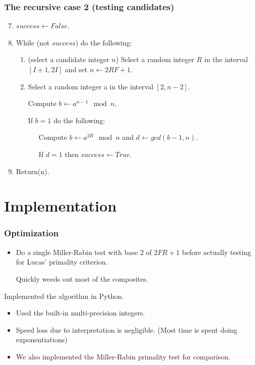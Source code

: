 \documentclass{beamer}
\begin{document}
\begin{frame}
\frametitle{The recursive case 2 (testing candidates)}
\begin{enumerate}
  \setcounter{enumi}{6}
\item $success\leftarrow False$. 
\item While (not $success$) do the following:
  \begin{enumerate}
\item (select a candidate integer $n$) Select a random integer $R$ in the interval 
$[I + 1, 2I]$ and set $n\leftarrow 2RF + 1$. 
\item Select a random integer a in the interval $[2, n - 2]$. 

Compute $b\leftarrow a^{n-1} \mod n$. 

If $b = 1$ do the following: 

\ \ \ Compute $b\leftarrow a^{2R} \mod n$ and $d\leftarrow  gcd(b - 1, n)$.

\ \ \ If $d = 1$ then $success\leftarrow True$.
\end{enumerate} 
\item Return(n). 
\end{enumerate}
\end{frame}

\section{Implementation}
\begin{frame}
\frametitle{Optimization}
\begin{itemize}
\item Do a single Miller-Rabin test with base 2 of $2FR+1$ before
  actually testing for Lucas' primality criterion.

  Quickly weeds out most of the composites.
\end{itemize}
\end{frame}

\begin{frame}
Implemented the algorithm in Python.
\begin{itemize}
\item Used the built-in multi-precision integers.

\item Speed loss due to interpretation is negligible. (Most time is
  spent doing exponentiations)


\item We also implemented the Miller-Rabin primality test for
  comparison.
\end{itemize}
\end{frame}
\end{document}
